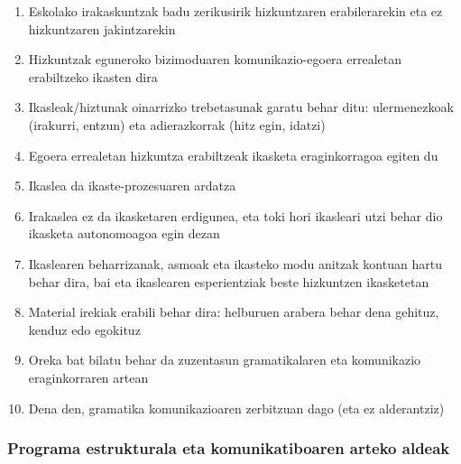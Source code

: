 \documentclass[
]{book}
\providecommand{\tightlist}{%
  \setlength{\itemsep}{0pt}\setlength{\parskip}{0pt}}
\begin{document}
\begin{enumerate}
\def\labelenumi{\arabic{enumi}.}
\tightlist
\item
  Eskolako irakaskuntzak badu zerikusirik hizkuntzaren erabilerarekin eta ez hizkuntzaren jakintzarekin
\item
  Hizkuntzak eguneroko bizimoduaren komunikazio-egoera errealetan erabiltzeko ikasten dira
\item
  Ikasleak/hiztunak oinarrizko trebetasunak garatu behar ditu: ulermenezkoak (irakurri, entzun) eta adierazkorrak (hitz egin, idatzi)
\item
  Egoera errealetan hizkuntza erabiltzeak ikasketa eraginkorragoa egiten du
\item
  Ikaslea da ikaste-prozesuaren ardatza
\item
  Irakaslea ez da ikasketaren erdigunea, eta toki hori ikasleari utzi behar dio ikasketa autonomoagoa egin dezan
\item
  Ikaslearen beharrizanak, asmoak eta ikasteko modu anitzak kontuan hartu behar dira, bai eta ikaslearen esperientziak beste hizkuntzen ikasketetan
\item
  Material irekiak erabili behar dira: helburuen arabera behar dena gehituz, kenduz edo egokituz
\item
  Oreka bat bilatu behar da zuzentasun gramatikalaren eta komunikazio eraginkorraren artean
\item
  Dena den, gramatika komunikazioaren zerbitzuan dago (eta ez alderantziz)
\end{enumerate}

\hypertarget{programa-estrukturala-eta-komunikatiboaren-arteko-aldeak}{%
\subsubsection{Programa estrukturala eta komunikatiboaren arteko aldeak}\label{programa-estrukturala-eta-komunikatiboaren-arteko-aldeak}}
\end{document}
